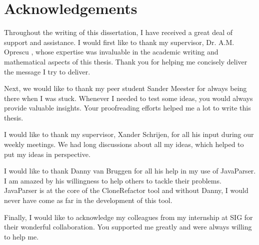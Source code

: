 \chapter*{Acknowledgements}
Throughout the writing of this dissertation, I have received a great deal of support and assistance. I would first like to thank my supervisor, Dr. A.M. Oprescu , whose expertise was invaluable in the academic writing and mathematical aspects of this thesis. Thank you for helping me concisely deliver the message I try to deliver.

Next, we would like to thank my peer student Sander Meester for always being there when I was stuck. Whenever I needed to test some ideas, you would always provide valuable insights. Your proofreading efforts helped me a lot to write this thesis.

I would like to thank my supervisor, Xander Schrijen, for all his input during our weekly meetings. We had long discussions about all my ideas, which helped to put my ideas in perspective.

I would like to thank Danny van Bruggen for all his help in my use of JavaParser. I am amazed by his willingness to help others to tackle their problems. JavaParser is at the core of the CloneRefactor tool and without Danny, I would never have come as far in the development of this tool.

Finally, I would like to acknowledge my colleagues from my internship at SIG for their wonderful collaboration. You supported me greatly and were always willing to help me.
